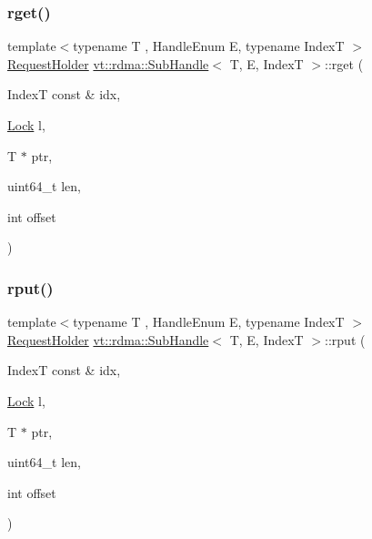 \mbox{\label{structvt_1_1rdma_1_1_sub_handle_a574e1878028cc096e008f815fd0b3db6}} 
\subsubsection{\texorpdfstring{rget()}{rget()}}
{\footnotesize\ttfamily template$<$typename T , Handle\+Enum E, typename IndexT $>$ \\
\hyperlink{structvt_1_1rdma_1_1_request_holder}{Request\+Holder} \hyperlink{structvt_1_1rdma_1_1_sub_handle}{vt\+::rdma\+::\+Sub\+Handle}$<$ T, E, IndexT $>$\+::rget (\begin{DoxyParamCaption}\item[{IndexT const \&}]{idx,  }\item[{\hyperlink{namespacevt_1_1rdma_ac5c20b41a653e520b6305d4d454ecb70}{Lock}}]{l,  }\item[{T $\ast$}]{ptr,  }\item[{uint64\+\_\+t}]{len,  }\item[{int}]{offset }\end{DoxyParamCaption})}

\mbox{\label{structvt_1_1rdma_1_1_sub_handle_a6d0b89af8d8a7f68d7b5a44d724e4364}} 
\subsubsection{\texorpdfstring{rput()}{rput()}}
{\footnotesize\ttfamily template$<$typename T , Handle\+Enum E, typename IndexT $>$ \\
\hyperlink{structvt_1_1rdma_1_1_request_holder}{Request\+Holder} \hyperlink{structvt_1_1rdma_1_1_sub_handle}{vt\+::rdma\+::\+Sub\+Handle}$<$ T, E, IndexT $>$\+::rput (\begin{DoxyParamCaption}\item[{IndexT const \&}]{idx,  }\item[{\hyperlink{namespacevt_1_1rdma_ac5c20b41a653e520b6305d4d454ecb70}{Lock}}]{l,  }\item[{T $\ast$}]{ptr,  }\item[{uint64\+\_\+t}]{len,  }\item[{int}]{offset }\end{DoxyParamCaption})}

